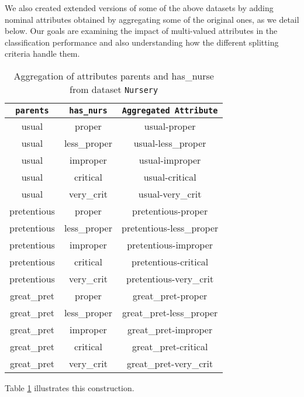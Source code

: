 We also created extended versions
of some of the above datasets 
by adding nominal attributes  obtained by aggregating some of the original ones, as 
we detail below.  
Our goals are  examining the impact of multi-valued
attributes in the classification performance and 
also understanding how the  different 
splitting criteria  handle them.


\begin{table}[]
\centering
\begin{tabular}{c|c|c} 
{\tt parents}     & {\tt has\_nurs}    & {\tt Aggregated Attribute}   \\ \hline
usual       & proper       & usual-proper             \\
usual       & less\_proper & usual-less\_proper       \\
usual       & improper     & usual-improper           \\
usual       & critical     & usual-critical           \\
usual       & very\_crit   & usual-very\_crit         \\
pretentious & proper       & pretentious-proper       \\
pretentious & less\_proper & pretentious-less\_proper \\
pretentious & improper     & pretentious-improper     \\
pretentious & critical     & pretentious-critical     \\
pretentious & very\_crit   & pretentious-very\_crit   \\
great\_pret & proper       & great\_pret-proper       \\
great\_pret & less\_proper & great\_pret-less\_proper \\
great\_pret & improper     & great\_pret-improper     \\
great\_pret & critical     & great\_pret-critical     \\
great\_pret & very\_crit   & great\_pret-very\_crit  
\end{tabular}
\caption{Aggregation of attributes parents and has\_nurse from dataset {\tt Nursery}}
\label{tab:Aggreation}

\end{table}

Table \ref{tab:Aggreation} illustrates this construction.

